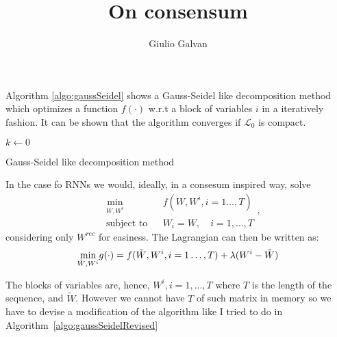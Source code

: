 \documentclass{article}
\title{On consensum}
\author{Giulio Galvan}
\begin{document}
	\maketitle

Algorithm \ref{algo:gaussSeidel} shows a Gauss-Seidel like decomposition method which optimizes a function $f(\cdot)$ w.r.t a block of variables $i$ in a iteratively fashion. It can be shown that the algorithm converges if $\mathcal{L}_0$ is compact.

\begin{algorithm}[]
	$k \gets 0$\\
	\caption{Gauss-Seidel like decomposition method}
	\label{algo:gaussSeidel}
\end{algorithm}

In the case fo RNNs we would, ideally, in a consesum inspired way, solve
\begin{equation*}
\begin{aligned}
& \underset{W,W^i}{\text{min}}
& & f(W,W^i, i=1\ldots,T) \\
& \text{subject to}
& & W_i = W,\quad i=1,\ldots,T
\end{aligned},
\end{equation*}
considering only $W^{rec}$ for easiness. 
The Lagrangian can then be written as:
\begin{equation}
	\underset{\tilde{W},W^i}{\text{min}} g(\cdot) = f(\tilde{W}, W^i, i=1\ldots,T) + \lambda (W^i-\tilde{W})\\
\end{equation}

The blocks of variables are, hence,  $W^i, i=1,...,T$ where $T$ is the length of the sequence, and $\tilde{W}$. However we cannot have $T$ of such matrix in memory so we have to devise a modification of the algorithm like I tried to do in Algorithm~\ref{algo:gaussSeidelRevised} 
\end{document}
